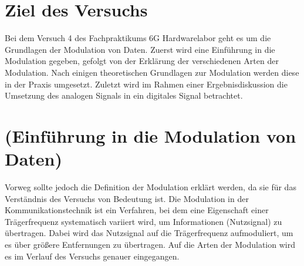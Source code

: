 
    \section{Ziel des Versuchs}
    Bei dem Versuch 4 des Fachpraktikums 6G Hardwarelabor geht es um die Grundlagen der Modulation von Daten. 
    Zuerst wird eine Einführung in die Modulation gegeben, gefolgt von der Erklärung der verschiedenen Arten der Modulation. Nach einigen theoretischen Grundlagen zur Modulation werden diese in der Praxis umgesetzt.
    Zuletzt wird im Rahmen einer Ergebnisdiskussion die Umsetzung des analogen Signals in ein digitales Signal betrachtet.
    \section{(Einführung in die Modulation von Daten)}
    Vorweg sollte jedoch die Definition der Modulation erklärt werden, da sie für das Verständnis des Versuchs von Bedeutung ist.
    Die Modulation in der Kommunikationstechnik ist ein Verfahren, bei dem eine Eigenschaft einer Trägerfrequenz systematisch variiert wird, um Informationen (Nutzsignal) zu übertragen.
    Dabei wird das Nutzsignal auf die Trägerfrequenz aufmoduliert, um es über größere Entfernungen zu übertragen.
    Auf die Arten der Modulation wird es im Verlauf des Versuchs genauer eingegangen.
\clearpage